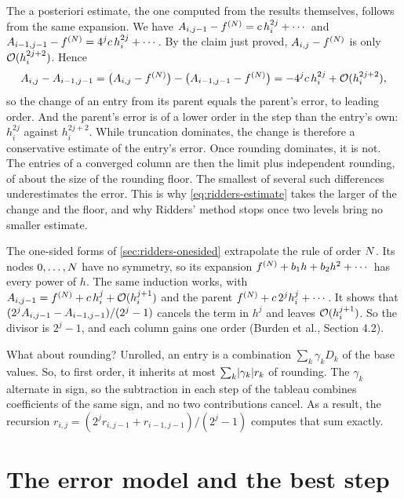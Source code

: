 The a posteriori estimate, the one computed from the results themselves, follows from the same expansion. We have
$A_{i,j-1} - f^{(N)} = c\, h_i^{2j} + \cdots$ and $A_{i-1,j-1} - f^{(N)} = 4^j c\, h_i^{2j} +
\cdots$. By the claim just proved, $A_{i,j} - f^{(N)}$ is only $\mathcal{O}(h_i^{2j+2})$. Hence
\[
  A_{i,j} - A_{i-1,j-1}
  = \bigl( A_{i,j} - f^{(N)} \bigr) - \bigl( A_{i-1,j-1} - f^{(N)} \bigr)
  = -4^j c\, h_i^{2j} + \mathcal{O}(h_i^{2j+2}),
\]
so the change of an entry from its parent equals the parent's error, to leading order. And the parent's error is of
a lower order in the step than the entry's own: $h_i^{2j}$ against $h_i^{2j+2}$. While truncation dominates, the
change is therefore a conservative estimate of the entry's error. Once rounding dominates, it is not. The entries of
a converged column are then the limit plus independent rounding, of about the size of the rounding floor. The
smallest of several such differences underestimates the error. This is why \cref{eq:ridders-estimate} takes the
larger of the change and the floor, and why Ridders' method stops once two levels bring no smaller estimate.

The one-sided forms of \cref{sec:ridders-onesided} extrapolate the  rule of order $N$. Its
nodes $0, \ldots, N$ have no symmetry, so its expansion $f^{(N)} + b_1 h + b_2 h^2 + \cdots$ has every
power of $h$. The same induction works, with $A_{i,j-1} = f^{(N)} + c\, h_i^{j} + \mathcal{O}(h_i^{j+1})$ and
the parent $f^{(N)} + c\, 2^j h_i^{j} + \cdots$. It shows that $(2^j A_{i,j-1} - A_{i-1,j-1}) / (2^j - 1)$
cancels the term in $h^j$ and leaves $\mathcal{O}(h_i^{j+1})$. So the divisor is $2^j - 1$, and each column gains one
order (Burden et al.,\cite{burden2016} Section 4.2).

What about rounding? Unrolled, an entry is a combination $\sum_k \gamma_k D_k$ of the base values. So, to first
order, it inherits at most $\sum_k \lvert \gamma_k \rvert r_k$ of rounding. The $\gamma_k$ alternate in sign, so the
subtraction in each step of the tableau combines coefficients of the same sign, and no two contributions cancel. As a
result, the recursion $r_{i,j} = (2^j r_{i,j-1} + r_{i-1,j-1}) / (2^j - 1)$ computes that sum exactly.

\section{The error model and the best step}\label{sec:derivations-model}

